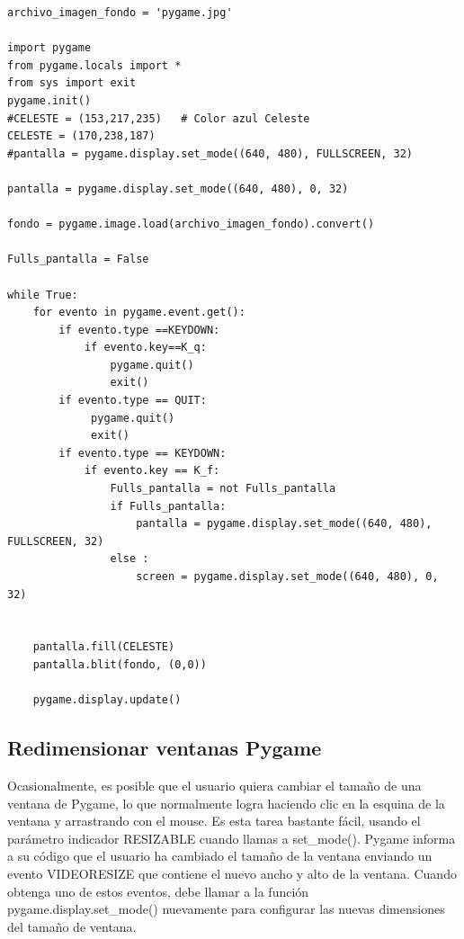 \vspace{-0.2cm}
\hspace{-2.7cm}{\ttfamily \scriptsize \_completa.py}\vspace{-0.84cm}
\begin{lstlisting}
archivo_imagen_fondo = 'pygame.jpg'

import pygame
from pygame.locals import *
from sys import exit
pygame.init()
#CELESTE = (153,217,235)   # Color azul Celeste 
CELESTE = (170,238,187)
#pantalla = pygame.display.set_mode((640, 480), FULLSCREEN, 32)

pantalla = pygame.display.set_mode((640, 480), 0, 32)

fondo = pygame.image.load(archivo_imagen_fondo).convert()

Fulls_pantalla = False

while True:
    for evento in pygame.event.get():
        if evento.type ==KEYDOWN:
            if evento.key==K_q:
                pygame.quit()
                exit()	
        if evento.type == QUIT:
             pygame.quit() 
             exit()
        if evento.type == KEYDOWN:
            if evento.key == K_f:
                Fulls_pantalla = not Fulls_pantalla        
                if Fulls_pantalla:
                    pantalla = pygame.display.set_mode((640, 480), FULLSCREEN, 32)
                else :
                    screen = pygame.display.set_mode((640, 480), 0, 32)      


    pantalla.fill(CELESTE)
    pantalla.blit(fondo, (0,0))

    pygame.display.update()

\end{lstlisting}


\subsection{Redimensionar ventanas Pygame}

Ocasionalmente, es posible que el usuario quiera cambiar el tamaño de una ventana de Pygame, lo que normalmente
logra haciendo clic en la esquina de la ventana y arrastrando con el mouse. Es esta tarea bastante fácil,
usando el parámetro indicador {\ttfamily RESIZABLE} cuando llamas a {\ttfamily set\_mode()}. Pygame informa a su 
código que el usuario ha cambiado el tamaño de la ventana enviando un evento {\ttfamily VIDEORESIZE} que 
contiene el nuevo ancho y alto de la ventana. Cuando obtenga uno de estos eventos, debe llamar
a la función {\ttfamily pygame.display.set\_mode()} nuevamente para configurar las nuevas dimensiones del tamaño de ventana.

